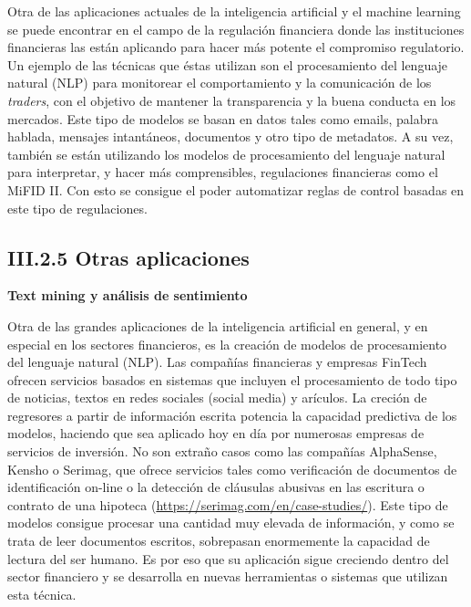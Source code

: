 \documentclass[]{DissertateUSU}
\begin{document}
\noindent Otra de las aplicaciones actuales de la inteligencia
artificial y el machine learning se puede encontrar en el campo de la
regulación financiera donde las instituciones financieras las están
aplicando para hacer más potente el compromiso regulatorio. Un ejemplo
de las técnicas que éstas utilizan son el procesamiento del lenguaje
natural (NLP) para monitorear el comportamiento y la comunicación de los
\emph{traders}, con el objetivo de mantener la transparencia y la buena
conducta en los mercados. Este tipo de modelos se basan en datos tales
como emails, palabra hablada, mensajes intantáneos, documentos y otro
tipo de metadatos. A su vez, también se están utilizando los modelos de
procesamiento del lenguaje natural para interpretar, y hacer más
comprensibles, regulaciones financieras como el MiFID II. Con esto se
consigue el poder automatizar reglas de control basadas en este tipo de
regulaciones.

\FloatBarrier
{}
\fancyfoot[C]{\thepage}

\subsection{III.2.5 \textbf{Otras aplicaciones}}

\justifying

\textbf{Text mining y análisis de sentimiento}

\noindent Otra de las grandes aplicaciones de la inteligencia artificial
en general, y en especial en los sectores financieros, es la creación de
modelos de procesamiento del lenguaje natural (NLP). Las compañías
financieras y empresas FinTech ofrecen servicios basados en sistemas que
incluyen el procesamiento de todo tipo de noticias, textos en redes
sociales (social media) y arículos. La creción de regresores a partir de
información escrita potencia la capacidad predictiva de los modelos,
haciendo que sea aplicado hoy en día por numerosas empresas de servicios
de inversión. No son extraño casos como las compañías AlphaSense, Kensho
o Serimag, que ofrece servicios tales como verificación de documentos de
identificación on-line o la detección de cláusulas abusivas en las
escritura o contrato de una hipoteca
(\url{https://serimag.com/en/case-studies/}). Este tipo de modelos
consigue procesar una cantidad muy elevada de información, y como se
trata de leer documentos escritos, sobrepasan enormemente la capacidad
de lectura del ser humano. Es por eso que su aplicación sigue creciendo
dentro del sector financiero y se desarrolla en nuevas herramientas o
sistemas que utilizan esta técnica.
\end{document}
